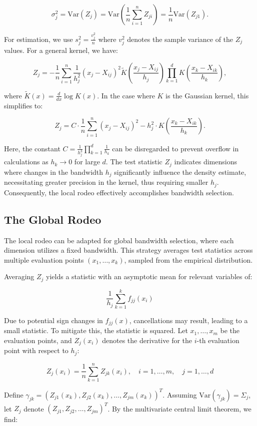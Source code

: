\documentclass{article}
\begin{document}
$$
\sigma^2_j = \text{Var}(Z_j) = \text{Var}\left(\frac{1}{n} \sum_{i=1}^{n} Z_{ji}\right) = \frac{1}{n} \text{Var}(Z_{j1}).
$$

For estimation, we use $s^2_j = \frac{v^2_j}{n}$ where $v^2_j$ denotes the sample variance of the $Z_j$ values. For a general kernel, we have:

$$
Z_j = -\frac{1}{n} \sum_{i=1}^{n} \frac{1}{h_j^2} (x_j - X_{ij})^2 \tilde{K}\left( \frac{x_j - X_{ij}}{h_j} \right) \prod_{k=1}^{d} K\left( \frac{x_k - X_{ik}}{h_k} \right),
$$

where $\tilde{K}(x) = \frac{d}{dx} \log K(x)$. In the case where $K$ is the Gaussian kernel, this simplifies to:

$$
Z_j = C \cdot \frac{1}{n} \sum_{i=1}^{n} (x_j - X_{ij})^2 - h_j^2 \cdot K\left( \frac{x_k - X_{ik}}{h_k} \right).
$$

Here, the constant $C = \frac{1}{h_j^3} \prod_{k=1}^{d} \frac{1}{h_k}$ can be disregarded to prevent overflow in calculations as $h_k \to 0$ for large $d$. The test statistic $Z_j$ indicates dimensions where changes in the bandwidth $h_j$ significantly influence the density estimate, necessitating greater precision in the kernel, thus requiring smaller $h_j$. Consequently, the local rodeo effectively accomplishes bandwidth selection.


\subsection{The Global Rodeo}

The local rodeo can be adapted for global bandwidth selection, where each dimension utilizes a fixed bandwidth. This strategy averages test statistics across multiple evaluation points $(x_1, \ldots, x_k)$, sampled from the empirical distribution.

Averaging $Z_j$ yields a statistic with an asymptotic mean for relevant variables of:

$$
\frac{1}{h_j} \sum_{k=1}^{k} f_{jj}(x_i)
$$

Due to potential sign changes in $f_{jj}(x)$, cancellations may result, leading to a small statistic. To mitigate this, the statistic is squared. Let $x_1, \ldots, x_m$ be the evaluation points, and $Z_j(x_i)$ denotes the derivative for the $i$-th evaluation point with respect to $h_j$:

$$
Z_j(x_i) = \frac{1}{n} \sum_{k=1}^{n} Z_{jk}(x_i), \quad i = 1, \ldots, m, \quad j = 1, \ldots, d
$$

Define $\gamma_{jk} = (Z_{j1}(x_k), Z_{j2}(x_k), \ldots, Z_{jm}(x_k))^T$. Assuming $\text{Var}(\gamma_{jk}) = \Sigma_j$, let $Z_j$ denote $ (Z_{j1}, Z_{j2}, \ldots, Z_{jm})^T$. By the multivariate central limit theorem, we find:
\end{document}
